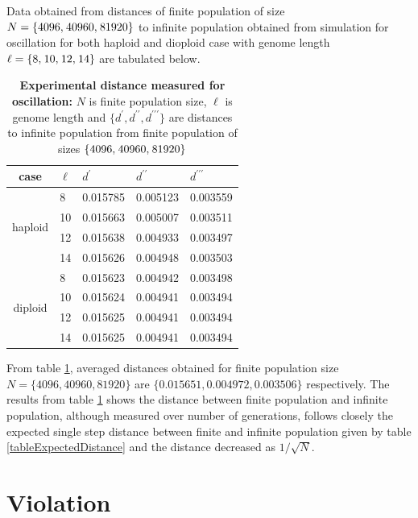 Data obtained from distances of finite population of size $N = \{4096, \hspace{0.01in} 40960, \hspace{0.01in} 81920\}$ to infinite population obtained from simulation 
for oscillation for both haploid and dioploid case with genome length $\ell = \{8, \hspace{0.01in} 10, \hspace{0.01in} 12, \hspace{0.01in} 14\}$ are tabulated below.
\begin{table}[ht]
\caption{\textbf{Experimental distance measured for oscillation:} $N$ is finite population size, $\ell$ is genome length and $\{d^\prime, d^{\prime\prime}, d^{\prime\prime\prime}\}$ are distances to infinite population from finite population of sizes $\{4096, \hspace{0.01in} 40960, \hspace{0.01in} 81920\}$ }
\centering
\begin{tabularx}{0.75\textwidth}{ c *{4}{X}}
\toprule
case & $\ell$ & $d^\prime$ & $d^{\prime\prime}$ & $d^{\prime\prime\prime}$\\
\midrule
\multirow{4}{*}{haploid} 	& 8 & 0.015785 & 0.005123 & 0.003559 \\
 				& 10 & 0.015663 & 0.005007 & 0.003511 \\ 
 			 	& 12 & 0.015638 & 0.004933 & 0.003497 \\
 	 			& 14 & 0.015626 & 0.004948 & 0.003503 \\ 
\midrule
\multirow{4}{*}{diploid} 	& 8 & 0.015623 & 0.004942 & 0.003498 \\
				& 10 & 0.015624 & 0.004941 & 0.003494 \\
			 	& 12 & 0.015625 & 0.004941 & 0.003494 \\
	 			& 14 & 0.015625 & 0.004941 & 0.003494 \\
\bottomrule

\end{tabularx}
\label{tableDistanceOsc}
\end{table}


From table \ref{tableDistanceOsc}, averaged distances obtained for finite population size $N = \{4096,  40960,  81920\}$ are $\{0.015651, 0.004972, 0.003506\} $ respectively.
The results from table \ref{tableDistanceOsc} shows the distance between finite population and infinite population, although measured over number of generations, follows closely 
the expected single step distance between finite and infinite population given by  table \ref{tableExpectedDistance} and the distance decreased as $1/\sqrt{N}$.






\newpage

\section{Violation}

